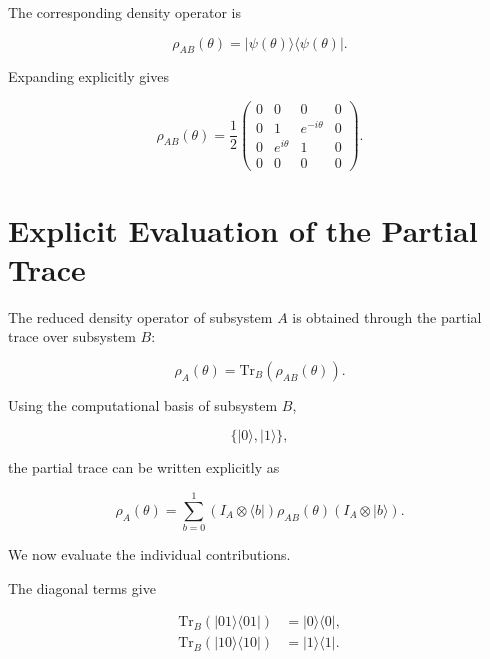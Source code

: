 The corresponding density operator is

\begin{equation}
\rho_{AB}(\theta)
=
|\psi(\theta)\rangle
\langle\psi(\theta)|.
\label{eq:appendix_phase_density_operator}
\end{equation}

Expanding explicitly gives

\begin{equation}
\rho_{AB}(\theta)
=
\frac{1}{2}
\begin{pmatrix}
0 & 0 & 0 & 0 \\
0 & 1 & e^{-i\theta} & 0 \\
0 & e^{i\theta} & 1 & 0 \\
0 & 0 & 0 & 0
\end{pmatrix}.
\label{eq:appendix_phase_density_matrix}
\end{equation}


\section*{Explicit Evaluation of the Partial Trace}

The reduced density operator of subsystem \( A \) is obtained through the partial trace over subsystem \( B \):

\begin{equation}
\rho_A(\theta)
=
\mathrm{Tr}_B
\left(
\rho_{AB}(\theta)
\right).
\label{eq:appendix_partial_trace_definition}
\end{equation}

Using the computational basis of subsystem \( B \),

\[
\{
|0\rangle,
|1\rangle
\},
\]

the partial trace can be written explicitly as

\begin{equation}
\rho_A(\theta)
=
\sum_{b=0}^{1}
\left(
I_A \otimes \langle b|
\right)
\rho_{AB}(\theta)
\left(
I_A \otimes |b\rangle
\right).
\label{eq:appendix_partial_trace_explicit}
\end{equation}

We now evaluate the individual contributions.

\medskip

The diagonal terms give

\begin{align}
\mathrm{Tr}_B
\left(
|01\rangle\langle 01|
\right)
&=
|0\rangle\langle 0|,
\nonumber
\\
\mathrm{Tr}_B
\left(
|10\rangle\langle 10|
\right)
&=
|1\rangle\langle 1|.
\label{eq:appendix_partial_trace_diagonal}
\end{align}

